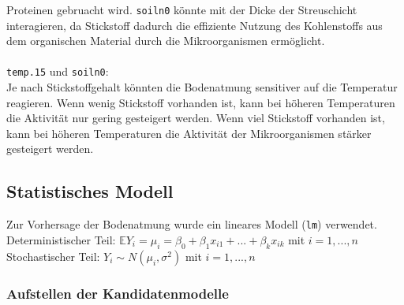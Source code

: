 Proteinen gebruacht wird. \texttt{soiln0} könnte mit der Dicke der 
Streuschicht interagieren, da Stickstoff dadurch die effiziente Nutzung des Kohlenstoffs aus dem organischen Material
durch die Mikroorganismen ermöglicht.
\\
\\
\texttt{temp.15} und \texttt{soiln0}:\\
Je nach Stickstoffgehalt könnten die Bodenatmung sensitiver auf die Temperatur reagieren. Wenn wenig Stickstoff
vorhanden ist, kann bei höheren Temperaturen die Aktivität nur gering gesteigert werden. Wenn viel Stickstoff
vorhanden ist, kann bei höheren Temperaturen die Aktivität der Mikroorganismen stärker gesteigert werden.

\subsection{Statistisches Modell} \label{Statistisches Modell}

Zur Vorhersage der Bodenatmung wurde ein lineares Modell (\texttt{lm}) verwendet.\\
Deterministischer Teil: $\mathbb{E}Y_i= \mu_i =\beta_0 + \beta_1x_{i1} + ... + \beta_kx_{ik}$ mit $i= 1,...,n$\\
Stochastischer Teil: $Y_i \sim N(\mu_i, \sigma^2)$ mit $i= 1,...,n$\\

\subsubsection{Aufstellen der Kandidatenmodelle} \label{Kandidatenmodelle}

